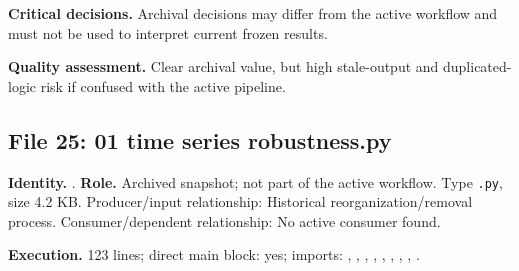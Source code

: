 \documentclass[
  11pt,
  a4paper]{article}
\begin{document}
\textbf{Critical decisions.} Archival decisions may differ from the
active workflow and must not be used to interpret current frozen
results.

\textbf{Quality assessment.} Clear archival value, but high stale-output
and duplicated-logic risk if confused with the active pipeline.

\subsection{File 25: 01 time series
robustness.py}\label{file-7810839493692613326}

\textbf{Identity.}
.
\textbf{Role.} Archived snapshot; not part of the active workflow. Type
\texttt{.py}, size 4.2 KB. Producer/input relationship: Historical
reorganization/removal process. Consumer/dependent relationship: No
active consumer found.

\textbf{Execution.} 123 lines; direct main block: yes; imports:
, , ,
,
,
,
,
, .
\end{document}
